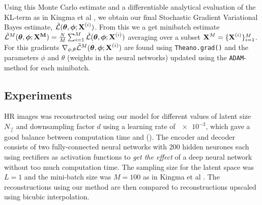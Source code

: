 Using this Monte Carlo estimate and a differentiable analytical evaluation of the KL-term as in Kingma et al \cite{Kingma2013}, we obtain our final Stochastic Gradient Variational Bayes estimate, $\tilde{\mathcal{L}}(\bm{\mathrm{\theta}},\bm{\mathrm{\phi}};\bm{\mathrm{X}}^{(i)})$. From this we a get minibatch estimate $\tilde{\mathcal{L}}^M(\bm{\mathrm{\theta}},\bm{\mathrm{\phi}};\bm{\mathrm{X^M}}) = \frac{N}{M}\sum^{M}_{i=1}\tilde{\mathcal{L}}(\bm{\mathrm{\theta}},\bm{\mathrm{\phi}};\bm{\mathrm{X}}^{(i)})$ averaging over a subset $\bm{\mathrm{X}}^M = \{\bm{\mathrm{X}}^{(i)}\}^M_{i=1}$. 
For this gradients $\nabla_{\phi,\theta} \tilde{\mathcal{L}}^M(\bm{\mathrm{\theta}},\bm{\mathrm{\phi}};\bm{\mathrm{X}}^{(i)})$ are found using \texttt{Theano.grad()} and the parameters $\phi$ and $\theta$ (weights in the neural networks) updated using the \texttt{ADAM}-method \cite{Kingma2014b} for each minibatch. 



\subsection{Experiments}
\label{sub:experiments}

HR images was reconstructed using our model for different values of latent size $N_{\vec{z}}$ and downsampling factor $d$ using a learning rate of $\num{e-3}$, which gave a good balance between computation time and  ().
The encoder and decoder consists of two fully-connected neural networks with $200$ hidden neurones each using rectifiers as activation functions to \emph{get the effect} of a deep neural network without too much computation time.
The sampling size for the latent space was $L = 1$ and the mini-batch size was $M = 100$ as in Kingma et al \cite{Kingma2013}.
The reconstructions using our method are then compared to reconstructions upscaled using bicubic interpolation.
